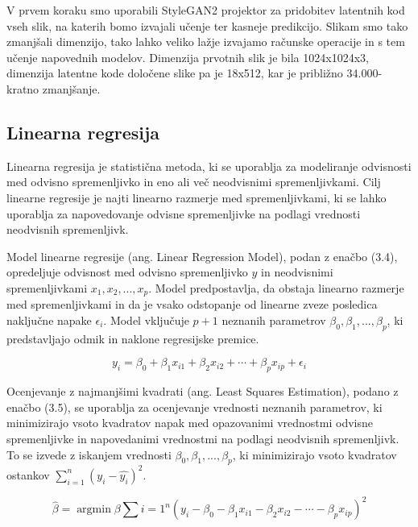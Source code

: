 \documentclass[a4paper,12pt,openright]{book}
\begin{document}
V prvem koraku smo uporabili StyleGAN2 projektor za pridobitev latentnih kod vseh slik, na katerih bomo izvajali učenje ter kasneje predikcijo. Slikam smo tako zmanjšali dimenzijo, tako lahko veliko lažje izvajamo računske operacije in s tem učenje napovednih modelov. Dimenzija prvotnih slik je bila 1024x1024x3, dimenzija latentne kode določene slike pa je 18x512, kar je približno 34.000-kratno zmanjšanje.

\subsection{Linearna regresija}

Linearna regresija je statistična metoda, ki se uporablja za modeliranje odvisnosti med odvisno spremenljivko in eno ali več neodvisnimi spremenljivkami. Cilj linearne regresije je najti linearno razmerje med spremenljivkami, ki se lahko uporablja za napovedovanje odvisne spremenljivke na podlagi vrednosti neodvisnih spremenljivk.



Model linearne regresije (ang. Linear Regression Model), podan z enačbo (3.4), opredeljuje odvisnost med odvisno spremenljivko $y$ in neodvisnimi spremenljivkami $x_1, x_2, ..., x_p$. Model predpostavlja, da obstaja linearno razmerje med spremenljivkami in da je vsako odstopanje od linearne zveze posledica naključne napake $\epsilon_i$. Model vključuje $p+1$ neznanih parametrov $\beta_0, \beta_1, ..., \beta_p$, ki predstavljajo odmik in naklone regresijske premice.

\begin{equation}
y_i = \beta_0 + \beta_1 x_{i1} + \beta_2 x_{i2} + \cdots + \beta_p x_{ip} + \epsilon_i
\end{equation}


Ocenjevanje z najmanjšimi kvadrati (ang. Least Squares Estimation), podano z enačbo (3.5), se uporablja za ocenjevanje vrednosti neznanih parametrov, ki minimizirajo vsoto kvadratov napak med opazovanimi vrednostmi odvisne spremenljivke in napovedanimi vrednostmi na podlagi neodvisnih spremenljivk. To se izvede z iskanjem vrednosti $\beta_0, \beta_1, ..., \beta_p$, ki minimizirajo vsoto kvadratov ostankov $\sum_{i=1}^{n} (y_i - \hat{y_i})^2$.

\begin{equation}
\hat{\beta} = \operatorname*{argmin}{\beta} \sum{i=1}^{n} \left(y_i - \beta_0 - \beta_1 x_{i1} - \beta_2 x_{i2} - \cdots - \beta_p x_{ip}\right)^2
\end{equation}
\end{document}

